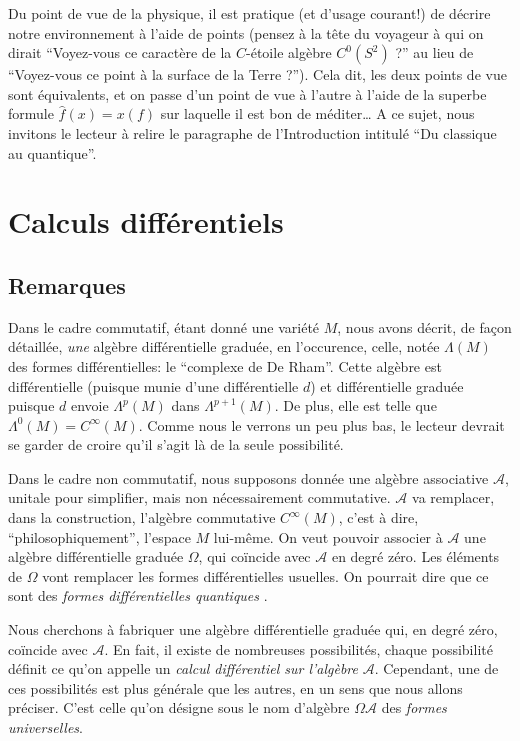 Du point de vue de la physique, il est pratique (et d'usage courant!) 
de d\'ecrire notre environnement \`a l'aide de points (pensez \`a la t\^ete du 
voyageur \`a qui on dirait ``Voyez-vous ce caract\`ere de la 
$C$-\'etoile alg\`ebre $C^{0}(S^{2})$ ?'' au lieu de ``Voyez-vous ce 
point \`a la surface de la Terre ?''). Cela dit, les deux points de vue 
sont \'equivalents, et on passe d'un point de vue \`a l'autre \`a l'aide de la 
superbe formule $\hat f(x) = x(f)$ sur laquelle il est bon 
de m\'editer\ldots
A ce sujet, nous invitons le lecteur \`a relire le paragraphe de 
l'Introduction intitul\'e ``Du classique au quantique''.

\section{Calculs diff\'erentiels} 
\label{sec: calcdiffnoncom}
\subsection{Remarques}
Dans le cadre commutatif, \'etant donn\'e une vari\'et\'e $M$, nous avons 
d\'ecrit, de fa\c con d\'etaill\'ee, {\sl une\/} alg\`ebre diff\'erentielle gradu\'ee, en l'occurence, 
celle, not\'ee $\Lambda(M)$ des formes diff\'erentielles: le ``complexe de 
De Rham''. Cette alg\`ebre est diff\'erentielle (puisque munie d'une 
diff\'erentielle $d$) et diff\'erentielle gradu\'ee puisque $d$ envoie 
$\Lambda^{p}(M)$ dans $\Lambda^{p+1}(M)$. 
De plus, elle est telle que $\Lambda^{0}(M) = C^\infty(M)$.
Comme nous le verrons un peu plus bas, le lecteur devrait se garder de croire 
qu'il s'agit l\`a de la seule possibilit\'e.


Dans le cadre non commutatif, nous supposons donn\'ee une alg\`ebre associative ${\mathcal A}$, 
unitale pour simplifier, mais non n\'ecessairement commutative. ${\mathcal 
A}$ va remplacer, dans la construction, l'alg\`ebre commutative 
$C^\infty(M)$, c'est \`a dire, ``philosophiquement'', l'espace $M$ 
lui-m\^eme. On veut pouvoir associer \`a ${\mathcal A}$ une alg\`ebre 
diff\'erentielle gradu\'ee $\Omega$, qui co\"incide avec ${\mathcal A}$ en 
degr\'e z\'ero. Les \'el\'ements de $\Omega$ vont remplacer les formes 
diff\'erentielles usuelles. On pourrait dire que ce sont des {\sl formes 
diff\'erentielles quantiques \/}.

Nous cherchons \`a fabriquer une alg\`ebre diff\'erentielle gradu\'ee qui, en 
degr\'e z\'ero, co\"incide avec ${\mathcal A}$. En fait, il existe de 
nombreuses possibilit\'es, chaque possibilit\'e d\'efinit ce qu'on  
appelle un {\sl calcul diff\'erentiel sur l'alg\`ebre\/} ${\mathcal A}$.  
Cependant, une de ces possibilit\'es est plus 
g\'en\'erale que les autres, en un sens que nous allons pr\'eciser.  
C'est celle qu'on d\'esigne sous le nom d'alg\`ebre $\Omega{\mathcal A}$ des  {\sl formes universelles}. 

